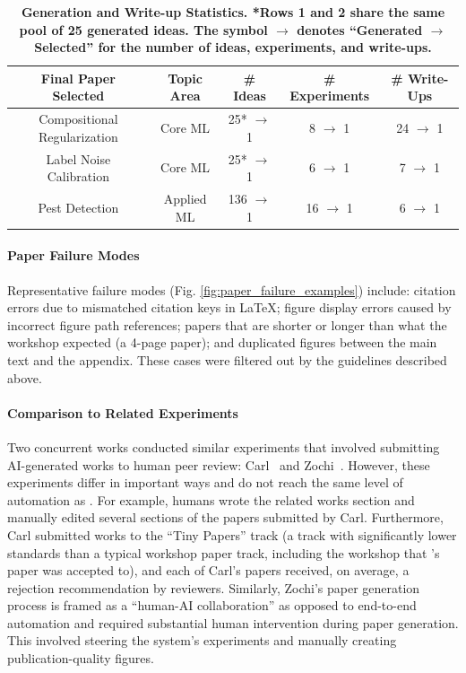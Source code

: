 \begin{appendices}
\begin{table}[!h]
\centering
\caption{\textbf{Generation and Write-up Statistics. *Rows 1 and 2 share the same pool of 25 generated ideas. The symbol $\to$ denotes ``Generated $\to$ Selected'' for the number of ideas, experiments, and write-ups.}}
\label{tab:app_idea_exp_paper_stats}
\begin{tabularx}{\columnwidth}{@{}c|c|c|c|c@{}}
\toprule
\textbf{Final Paper Selected} & \textbf{Topic Area} & \textbf{\# Ideas} & \textbf{\# Experiments} &  \textbf{\# Write-Ups} \\ \midrule
Compositional Regularization   & Core ML &  25* $\to$ 1  & 8 $\to$ 1 & 24 $\to$ 1 \\
Label Noise Calibration  & Core ML & 25* $\to$ 1 & 6 $\to$ 1 & 7 $\to$ 1  \\
Pest Detection  & Applied ML & 136 $\to$ 1 & 16 $\to$ 1 & 6 $\to$ 1 \\ \bottomrule
\end{tabularx}

\end{table}

\paragraph{Paper Failure Modes}


Representative failure modes (Fig. \ref{fig:paper_failure_examples}) include: citation errors due to mismatched citation keys in LaTeX; figure display errors caused by incorrect figure path references; papers that are shorter or longer than what the workshop expected (a 4-page paper); and duplicated figures between the main text and the appendix.
These cases were filtered out by the guidelines described above.

\paragraph{Comparison to Related Experiments}

Two concurrent works conducted similar experiments that involved submitting AI-generated works to human peer review: Carl~\citep{autoscience2025carl} and Zochi~\citep{intology2025zochi}. However, these experiments differ in important ways and do not reach the same level of automation as \ouralgo. For example, humans wrote the related works section and manually edited several sections of the papers submitted by Carl. Furthermore, Carl submitted works to the ``Tiny Papers'' track (a track with significantly lower standards than a typical workshop paper track, including the workshop that \ouralgo’s paper was accepted to), and each of Carl's papers received, on average, a rejection recommendation by reviewers. Similarly, Zochi's paper generation process is framed as a ``human-AI collaboration'' as opposed to end-to-end automation and required substantial human intervention during paper generation. This involved steering the system's experiments and manually creating publication-quality figures.


\end{appendices}
